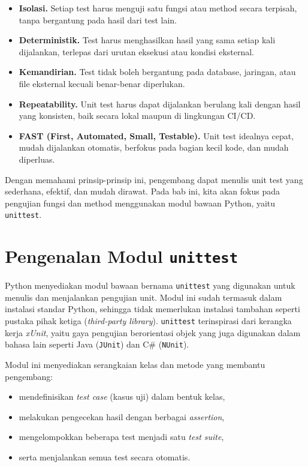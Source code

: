 \begin{itemize}
    \item \textbf{Isolasi.}  
    Setiap test harus menguji satu fungsi atau method secara terpisah, tanpa bergantung pada hasil dari test lain.
    
    \item \textbf{Deterministik.}  
    Test harus menghasilkan hasil yang sama setiap kali dijalankan, terlepas dari urutan eksekusi atau kondisi eksternal.
    
    \item \textbf{Kemandirian.}  
    Test tidak boleh bergantung pada database, jaringan, atau file eksternal kecuali benar-benar diperlukan.
    
    \item \textbf{Repeatability.}  
    Unit test harus dapat dijalankan berulang kali dengan hasil yang konsisten, baik secara lokal maupun di lingkungan CI/CD.
    
    \item \textbf{FAST (First, Automated, Small, Testable).}  
    Unit test idealnya cepat, mudah dijalankan otomatis, berfokus pada bagian kecil kode, dan mudah diperluas.
\end{itemize}

Dengan memahami prinsip-prinsip ini, pengembang dapat menulis unit test yang sederhana, efektif, dan mudah dirawat.  
Pada bab ini, kita akan fokus pada pengujian fungsi dan method menggunakan modul bawaan Python, yaitu \texttt{unittest}.


\section{Pengenalan Modul \texttt{unittest}}

Python menyediakan modul bawaan bernama \texttt{unittest} yang digunakan untuk menulis dan menjalankan pengujian unit. Modul ini sudah termasuk dalam instalasi standar Python, sehingga tidak memerlukan instalasi tambahan seperti pustaka pihak ketiga (\textit{third-party library}).  
\texttt{unittest} terinspirasi dari kerangka kerja \textit{xUnit}, yaitu gaya pengujian berorientasi objek yang juga digunakan dalam bahasa lain seperti Java (\texttt{JUnit}) dan C\# (\texttt{NUnit}).

Modul ini menyediakan serangkaian kelas dan metode yang membantu pengembang:
\begin{itemize}
    \item mendefinisikan \textit{test case} (kasus uji) dalam bentuk kelas,
    \item melakukan pengecekan hasil dengan berbagai \textit{assertion},
    \item mengelompokkan beberapa test menjadi satu \textit{test suite},
    \item serta menjalankan semua test secara otomatis.
\end{itemize}

